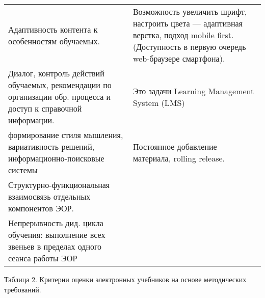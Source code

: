 \begin{longtable}[]{@{}
  >{\raggedright\arraybackslash}p{}
  >{\raggedright\arraybackslash}p{}@{}}
Адаптивность контента к особенностям обучаемых. & Возможность увеличить
шрифт, настроить цвета --- адаптивная верстка, подход mobile first.
(Доступность в первую очередь web-браузере смартфона). \\
Диалог, контроль действий обучаемых, рекомендации по организации обр.
процесса и доступ к справочной информации. & Это задачи Learning
Management System (LMS) \\
формирование стиля мышления, вариативность решений,
информационно-поисковые системы & Постоянное добавление материала,
rolling release. \\
Структурно-функциональная взаимосвязь отдельных компонентов ЭОР. & \\
Непрерывность дид. цикла обучения: выполнение всех звеньев в пределах
одного сеанса работы ЭОР & \\
\bottomrule
\end{longtable}

Таблица 2. Критерии оценки электронных учебников на основе методических
требований.

